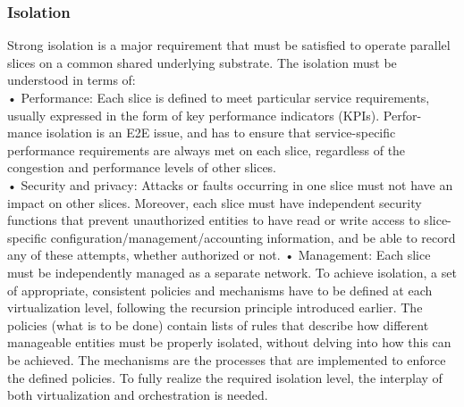 \documentclass{article}
\begin{document}
\subsubsection{Isolation}
Strong isolation is a major requirement that must
be satisfied to operate parallel slices on a common shared underlying substrate. The isolation
must be understood in terms of:\\
• Performance: Each slice is defined to meet particular service requirements, usually expressed in the
form of key performance indicators (KPIs). Perfor-
mance isolation is an E2E issue, and has to ensure
that service-specific performance requirements are
always met on each slice, regardless of the congestion and performance levels of other slices.\\
• Security and privacy: Attacks or faults occurring in one slice must not have an impact on
other slices. Moreover, each slice must have
independent security functions that prevent unauthorized entities to have read or write access to
slice-specific configuration/management/accounting information, and be able to record any of
these attempts, whether authorized or not.
• Management: Each slice must be independently managed as a separate network.
To achieve isolation, a set of appropriate, consistent policies and mechanisms have to be defined
at each virtualization level, following the recursion
principle introduced earlier. The policies (what is to
be done) contain lists of rules that describe how different manageable entities must be properly isolated, without delving into how this can be achieved.
The mechanisms are the processes that are implemented to enforce the defined
policies. To fully realize the
required isolation level, the interplay of both virtualization and orchestration is needed.
\end{document}
